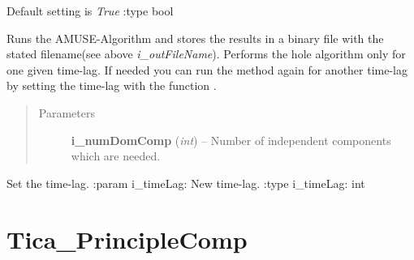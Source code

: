 \documentclass[letterpaper,10pt,english]{sphinxmanual}
\begin{document}
\begin{fulllineitems}
\begin{quote}
\begin{description}
\begin{itemize}
\end{itemize}

\end{description}\end{quote}

Default setting is \emph{True}
:type bool

\begin{fulllineitems}
\label{tica:Tica_Amuse.TicaAmuse.performAmuse}
Runs the AMUSE-Algorithm and stores the results in a binary file with
the stated filename(see above \emph{i\_outFileName}).
Performs the hole algorithm only for one given time-lag.
If needed you can run the method again for another time-lag by setting the time-lag
with the function .
\begin{quote}\begin{description}
\item[{Parameters}] \leavevmode
\textbf{i\_numDomComp} (\emph{int}) -- Number of independent components which are needed.

\end{description}\end{quote}

\end{fulllineitems}


\begin{fulllineitems}
\label{tica:Tica_Amuse.TicaAmuse.setTimeLag}
Set the time-lag.
:param i\_timeLag: New time-lag.
:type i\_timeLag: int

\end{fulllineitems}


\end{fulllineitems}



\section{Tica\_PrincipleComp}
\label{tica:tica-principlecomp}\label{tica:module-Tica_PrincipleComp}
\end{document}
